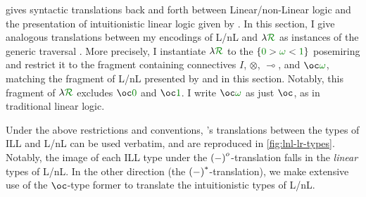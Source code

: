  gives syntactic translations back and forth between
Linear/non-Linear logic and the presentation of intuitionistic linear logic
given by \citet{BBdePH93}.
In this section, I give analogous translations between my encodings of L/nL and
$\name$ as instances of the generic traversal .
More precisely, I instantiate $\name$ to the $\{\gr0 > \gr\omega < \gr1\}$
posemiring and restrict it to the fragment containing connectives $I$,
$\otimes$, $\multimap$, and $\oc\gr\omega$, matching the fragment of L/nL
presented by \citeauthor{Benton94} and in this section.
Notably, this fragment of $\name$ excludes $\oc\gr0$ and $\oc\gr1$.
I write $\oc\gr\omega$ as just $\oc$, as in traditional linear logic.

Under the above restrictions and conventions, \citeauthor{Benton94}'s
translations between the types of ILL and L/nL can be used verbatim,
and are reproduced in \cref{fig:lnl-lr-types}.
Notably, the image of each ILL type under the $\plr{-}^o$-translation falls in
the \emph{linear} types of L/nL.
In the other direction (the $\plr{-}^*$-translation), we make extensive use of
the $\oc$-type former to translate the intuitionistic types of L/nL.

